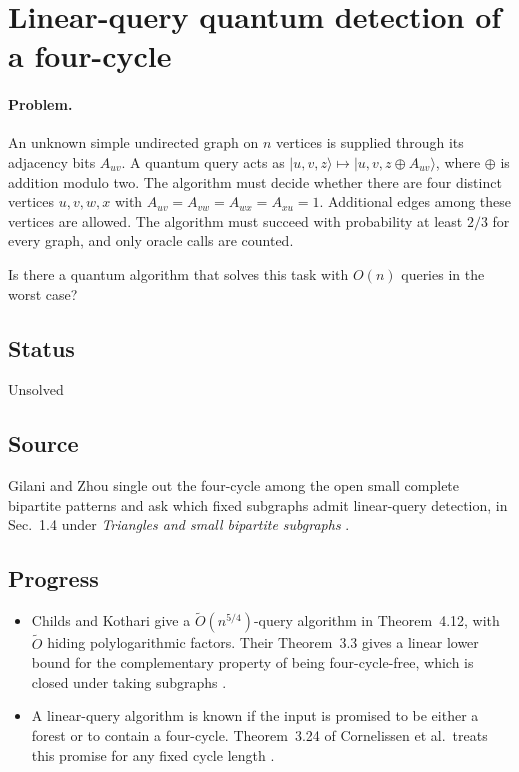 \section{Linear-query quantum detection of a four-cycle}
\label{sec:op_9ce69cbf239dab98}

\paragraph{Problem.}
An unknown simple undirected graph on $n$ vertices is supplied through its adjacency bits $A_{uv}$. A quantum query acts as $\lvert u,v,z\rangle\mapsto\lvert u,v,z\oplus A_{uv}\rangle$, where $\oplus$ is addition modulo two. The algorithm must decide whether there are four distinct vertices $u,v,w,x$ with $A_{uv}=A_{vw}=A_{wx}=A_{xu}=1$. Additional edges among these vertices are allowed. The algorithm must succeed with probability at least $2/3$ for every graph, and only oracle calls are counted.

Is there a quantum algorithm that solves this task with $O(n)$ queries in the worst case?

\subsection*{Status}

Unsolved

\subsection*{Source}

Gilani and Zhou single out the four-cycle among the open small complete bipartite patterns and ask which fixed subgraphs admit linear-query detection, in Sec.~1.4 under \emph{Triangles and small bipartite subgraphs} .

\subsection*{Progress}

\begin{itemize}
  \item Childs and Kothari give a $\widetilde O(n^{5/4})$-query algorithm in Theorem~4.12, with $\widetilde O$ hiding polylogarithmic factors. Their Theorem~3.3 gives a linear lower bound for the complementary property of being four-cycle-free, which is closed under taking subgraphs .

  \item A linear-query algorithm is known if the input is promised to be either a forest or to contain a four-cycle. Theorem~3.24 of Cornelissen et al.\ treats this promise for any fixed cycle length .
\end{itemize}


